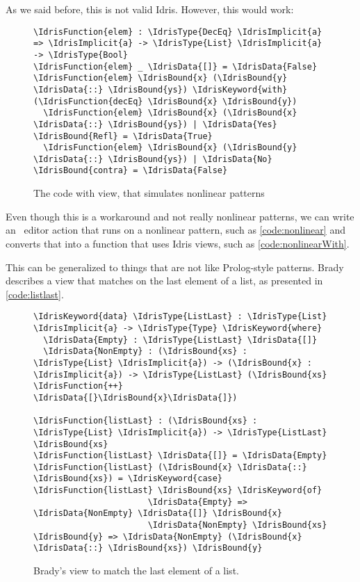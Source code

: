 As we said before, this is not valid Idris. However, this would work:

\begin{figure}[ht]
\caption{The code with view, that simulates nonlinear patterns}
\label{code:nonlinearWith}
\begin{Verbatim}
\IdrisFunction{elem} : \IdrisType{DecEq} \IdrisImplicit{a} => \IdrisImplicit{a} -> \IdrisType{List} \IdrisImplicit{a} -> \IdrisType{Bool}
\IdrisFunction{elem} _ \IdrisData{[]} = \IdrisData{False}
\IdrisFunction{elem} \IdrisBound{x} (\IdrisBound{y} \IdrisData{::} \IdrisBound{ys}) \IdrisKeyword{with} (\IdrisFunction{decEq} \IdrisBound{x} \IdrisBound{y})
  \IdrisFunction{elem} \IdrisBound{x} (\IdrisBound{x} \IdrisData{::} \IdrisBound{ys}) | \IdrisData{Yes} \IdrisBound{Refl} = \IdrisData{True}
  \IdrisFunction{elem} \IdrisBound{x} (\IdrisBound{y} \IdrisData{::} \IdrisBound{ys}) | \IdrisData{No} \IdrisBound{contra} = \IdrisData{False}
\end{Verbatim}
\end{figure}

Even though this is a workaround and not really nonlinear patterns, we can
write an \Elab\ editor action that runs on a nonlinear pattern, such as
\autoref{code:nonlinear} and converts that into a function that uses Idris
views, such as \autoref{code:nonlinearWith}.

This can be generalized to things that are not like Prolog-style patterns.
Brady describes a view that matches on the last element of
a list, as presented in \autoref{code:listlast}.

\begin{figure}[ht]
\caption{Brady's view to match the last element of a list.\cite{tdd}}
\label{code:listlast}
\begin{Verbatim}
\IdrisKeyword{data} \IdrisType{ListLast} : \IdrisType{List} \IdrisImplicit{a} -> \IdrisType{Type} \IdrisKeyword{where}
  \IdrisData{Empty} : \IdrisType{ListLast} \IdrisData{[]}
  \IdrisData{NonEmpty} : (\IdrisBound{xs} : \IdrisType{List} \IdrisImplicit{a}) -> (\IdrisBound{x} : \IdrisImplicit{a}) -> \IdrisType{ListLast} (\IdrisBound{xs} \IdrisFunction{++} \IdrisData{[}\IdrisBound{x}\IdrisData{]})

\IdrisFunction{listLast} : (\IdrisBound{xs} : \IdrisType{List} \IdrisImplicit{a}) -> \IdrisType{ListLast} \IdrisBound{xs}
\IdrisFunction{listLast} \IdrisData{[]} = \IdrisData{Empty}
\IdrisFunction{listLast} (\IdrisBound{x} \IdrisData{::} \IdrisBound{xs}) = \IdrisKeyword{case} \IdrisFunction{listLast} \IdrisBound{xs} \IdrisKeyword{of}
                       \IdrisData{Empty} => \IdrisData{NonEmpty} \IdrisData{[]} \IdrisBound{x}
                       \IdrisData{NonEmpty} \IdrisBound{xs} \IdrisBound{y} => \IdrisData{NonEmpty} (\IdrisBound{x} \IdrisData{::} \IdrisBound{xs}) \IdrisBound{y}
\end{Verbatim}
\end{figure}

